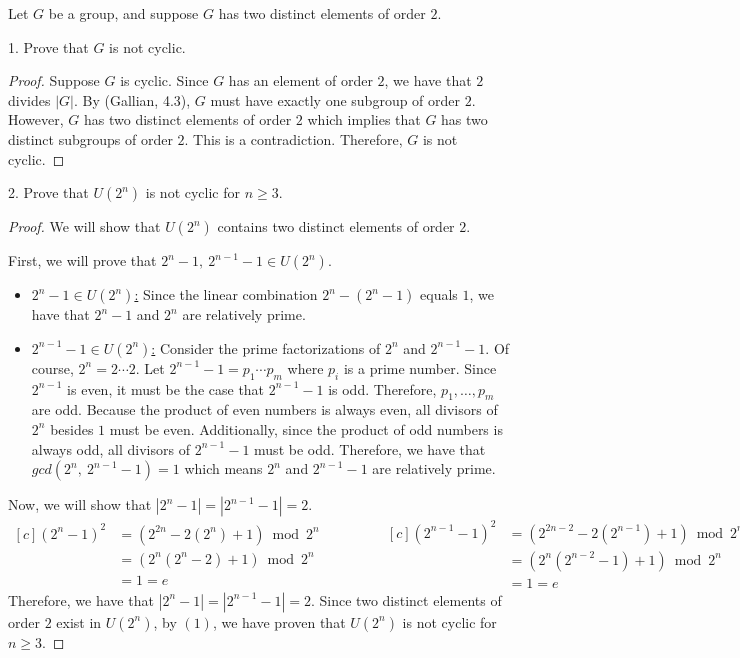 \documentclass[12pt,reqno]{article}
\theoremstyle{plain}
\theoremstyle{definition}
\begin{document}

Let \(G\) be a group, and suppose \(G\) has two distinct elements of order \(2\).

1. Prove that \(G\) is not cyclic.
\begin{proof}
    Suppose \(G\) is cyclic. Since \(G\) has an element of order \(2\), we have that \(2\) divides \(|G|\). By (Gallian, 4.3),
    \(G\) must have exactly one subgroup of order \(2\). However, \(G\) has two distinct elements of
    order \(2\) which implies that \(G\) has two distinct subgroups of order \(2\). This is a contradiction. Therefore,
    \(G\) is not cyclic.
\end{proof}

2. Prove that \(U(2^n)\) is not cyclic for \(n\geq 3\).
\begin{proof}
    We will show that \(U(2^n)\) contains two distinct elements of order \(2\).

    First, we will prove that \(2^n-1,\ 2^{n-1}-1\in U(2^n)\).
    \begin{itemize}
        \item \underline{\(2^n-1\in U(2^n)\):} Since the linear combination \(2^n-(2^n-1)\) equals \(1\), we have that
        \(2^n-1\) and \(2^n\) are relatively prime.
        \item \underline{\(2^{n-1}-1\in U(2^n)\):} Consider the prime factorizations of \(2^n\) and \(2^{n-1}-1\).
        Of course, \(2^n=2\cdots 2\). Let \(2^{n-1}-1=p_1\cdots p_m\) where \(p_i\) is a prime number. Since \(2^{n-1}\) is even, it must be the case
        that \(2^{n-1}-1\) is odd. Therefore, \(p_1,\ldots,p_m\) are odd. Because the product of even numbers is always even, all divisors of \(2^n\)
        besides \(1\) must be even. Additionally, since the product of odd numbers is always odd, all divisors of \(2^{n-1}-1\) must be odd. 
        Therefore, we have that \(gcd(2^n,\ 2^{n-1}-1)=1\) which means \(2^n\) and \(2^{n-1}-1\) are relatively prime.
    \end{itemize}

    Now, we will show that \(|2^n-1|=|2^{n-1}-1|=2\).
    \begin{equation*}
        \begin{aligned}[c]
            (2^n-1)^2 &= (2^{2n}-2(2^n)+1)\bmod{2^n}\\
            &= (2^n(2^n-2)+1)\bmod{2^n}\\
            &= 1 = e
        \end{aligned}
        \qquad\qquad
        \begin{aligned}[c]
            (2^{n-1}-1)^2 &= (2^{2n-2}-2(2^{n-1})+1)\bmod{2^n}\\
            &= (2^n(2^{n-2}-1)+1)\bmod{2^n}\\
            &= 1 = e
        \end{aligned}
    \end{equation*}
    Therefore, we have that \(|2^n-1|=|2^{n-1}-1|=2\). Since two distinct elements of 
    order \(2\) exist in \(U(2^n)\), by \((1)\), we have proven that \(U(2^n)\) is not cyclic for \(n\geq 3\).
\end{proof}
\end{document}
